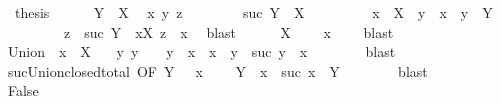 \begin{isabellebody}
\ {\isachardoublequoteopen}{\isasymnot}\ {\isacharquery}{\kern0pt}thesis{\isachardoublequoteclose}\isanewline
\ \ \ \ \isamarkupfalse%
\ {\isacartoucheopen}Y\ {\isasymsubseteq}\ {\isasymUnion}X{\isacartoucheclose}\ \isamarkupfalse%
\ x\ y\ z\isanewline
\ \ \ \ \ \ \ {\isachardoublequoteopen}{\isasymnot}\ suc\ Y\ {\isasymsubseteq}\ {\isasymUnion}X{\isachardoublequoteclose}\isanewline
\ \ \ \ \ \ \ \ \ {\isachardoublequoteopen}x\ {\isasymin}\ X{\isachardoublequoteclose}\ \ {\isachardoublequoteopen}y\ {\isasymin}\ x{\isachardoublequoteclose}\ \ {\isachardoublequoteopen}y\ {\isasymnotin}\ Y{\isachardoublequoteclose}\isanewline
\ \ \ \ \ \ \ \ \ {\isachardoublequoteopen}z\ {\isasymin}\ suc\ Y{\isachardoublequoteclose}\ \ {\isachardoublequoteopen}{\isasymforall}x{\isasymin}X{\isachardot}{\kern0pt}\ z\ {\isasymnotin}\ x{\isachardoublequoteclose}\ \isamarkupfalse%
\ blast\isanewline
\ \ \ \ \isamarkupfalse%
\ {\isacartoucheopen}X\ {\isasymsubseteq}\ {\isasymC}{\isacartoucheclose}\ \isamarkupfalse%
\ {\isachardoublequoteopen}x\ {\isasymin}\ {\isasymC}{\isachardoublequoteclose}\ \isamarkupfalse%
\ blast\isanewline
\ \ \ \ \isamarkupfalse%
\ Union\ \ {\isacartoucheopen}x\ {\isasymin}\ X{\isacartoucheclose}\ \isamarkupfalse%
\ {\isacharasterisk}{\kern0pt}{\isacharcolon}{\kern0pt}\ {\isachardoublequoteopen}{\isasymAnd}y{\isachardot}{\kern0pt}\ y\ {\isasymin}\ {\isasymC}\ {\isasymLongrightarrow}\ y\ {\isasymsubseteq}\ x\ {\isasymLongrightarrow}\ x\ {\isacharequal}{\kern0pt}\ y\ {\isasymor}\ suc\ y\ {\isasymsubseteq}\ x{\isachardoublequoteclose}\isanewline
\ \ \ \ \ \ \isamarkupfalse%
\ blast\isanewline
\ \ \ \ \isamarkupfalse%
\ suc{\isacharunderscore}{\kern0pt}Union{\isacharunderscore}{\kern0pt}closed{\isacharunderscore}{\kern0pt}total{\isacharprime}{\kern0pt}\ {\isacharbrackleft}{\kern0pt}OF\ {\isacartoucheopen}Y\ {\isasymin}\ {\isasymC}{\isacartoucheclose}\ {\isacartoucheopen}x\ {\isasymin}\ {\isasymC}{\isacartoucheclose}{\isacharbrackright}{\kern0pt}\ \isamarkupfalse%
\ {\isachardoublequoteopen}Y\ {\isasymsubseteq}\ x\ {\isasymor}\ suc\ x\ {\isasymsubseteq}\ Y{\isachardoublequoteclose}\isanewline
\ \ \ \ \ \ \isamarkupfalse%
\ blast\isanewline
\ \ \ \ \isamarkupfalse%
\ \isamarkupfalse%
\ False\isanewline
\ \ \ \ \isamarkupfalse%

\end{isabellebody}
